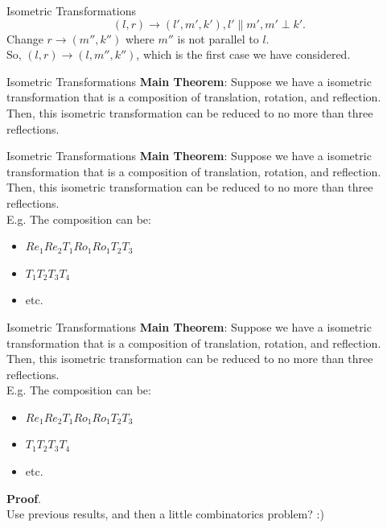 \documentclass{beamer}
\begin{document}
\begin{frame}{Isometric Transformations}
	\[
		(l,r)\to (l', m', k'), l' \parallel m', m'\perp k'
	.\] 
	Change $r\to (m'', k'')$ where  $m''$ is not parallel to $l$.\\

	So, $(l, r)\to (l, m'', k'')$, which is the first case we have
	considered.
\end{frame}
\begin{frame}{Isometric Transformations}
	\large{\textbf{Main Theorem}}:
	Suppose we have a isometric transformation that is a composition
	of translation, rotation, and reflection. Then, this isometric
	transformation can be reduced to no more than three reflections.
\end{frame}
\begin{frame}{Isometric Transformations}
	\large{\textbf{Main Theorem}}:
	Suppose we have a isometric transformation that is a composition
	of translation, rotation, and reflection. Then, this isometric
	transformation can be reduced to no more than three reflections.\\

	E.g. The composition can be:
	\begin{itemize}
		\item $Re_1 Re_2 T_1 Ro_1 Ro_1 T_2 T_3$
		\item $T_1 T_2 T_3 T_4$
		\item etc.
	\end{itemize}
\end{frame}
\begin{frame}{Isometric Transformations}
	\large{\textbf{Main Theorem}}:
	Suppose we have a isometric transformation that is a composition
	of translation, rotation, and reflection. Then, this isometric
	transformation can be reduced to no more than three reflections.\\

	E.g. The composition can be:
	\begin{itemize}
		\item $Re_1 Re_2 T_1 Ro_1 Ro_1 T_2 T_3$
		\item $T_1 T_2 T_3 T_4$
		\item etc.
	\end{itemize}
	\textbf{Proof}.\\
	Use previous results, and then a little combinatorics problem? :)
\end{frame}
\end{document}

